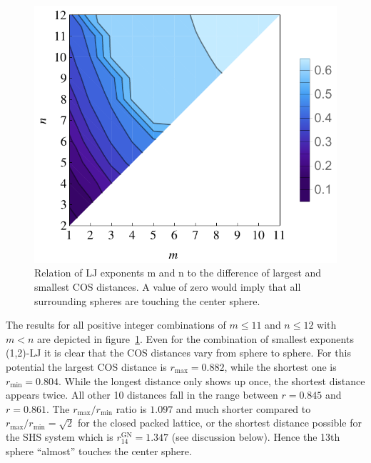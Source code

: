 \begin{figure}
    \centering
    \includegraphics[width=.8\textwidth]{gregory-newton/N14.pdf}
    \caption{Relation of LJ exponents m and n to the difference of largest and
    smallest \ac{COS} distances.  A value of zero would imply that all
    surrounding spheres are touching the center sphere.}
    \label{fig:gregorynewton-N14}
\end{figure}

The results for all positive integer combinations of $m\leq11$ and $n\leq12$
with $m<n$ are depicted in figure~\ref{fig:gregorynewton-N14}. Even for the
combination of smallest exponents (1,2)-\ac{LJ} it is clear that the \ac{COS}
distances vary from sphere to sphere. For this potential the largest \ac{COS}
distance is $r_\text{max}=0.882$, while the shortest one is
$r_\text{min}=0.804$. While the longest distance only shows up once, the
shortest distance appears twice. All other 10 distances fall in the range
between $r = 0.845$ and $r = 0.861$. The $r_\text{max} /r_\text{min}$ ratio is
$1.097$ and much shorter compared to $r_\text{max} /r_\text{min}= \sqrt{2}$ for
the closed packed lattice, or the shortest distance possible for the \ac{SHS}
system which is $r_{14}^\text{GN} = 1.347$ (see discussion below). Hence the
13th sphere ``almost'' touches the center sphere.

